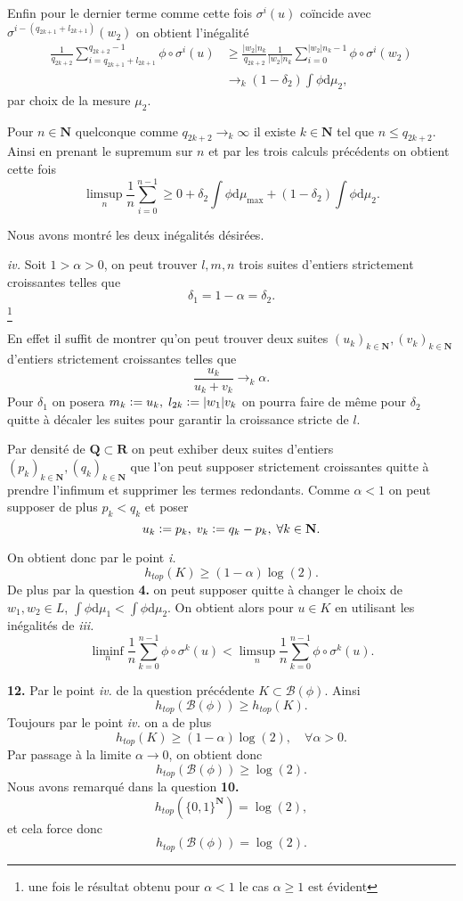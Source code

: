 \documentclass[12pt]{article}
\newcommand{\defeq}{\vcentcolon=}
\newcommand{\R}{\mathbf{R}}
\newcommand{\N}{\mathbf{N}}
\newcommand{\Q}{\mathbf{Q}}
\newcommand{\de}{\mathrm{d}}
\begin{document}
Enfin pour le dernier terme comme cette fois $\sigma^{i}(u)$ coïncide avec $\sigma^{i-(q_{2k+1}+l_{2k+1})}(w_{2})$ on obtient l'inégalité
\begin{align*}
        \frac{1}{q_{2k+2}}\sum_{i=q_{2k+1}+l_{2k+1}}^{q_{2k+2}-1} \phi\circ\sigma^{i}(u) &\ge \frac{|w_{2}|n_{k}}{q_{2k+2}}\frac{1}{|w_{2}|n_{k}}\sum_{i=0}^{|w_{2}|n_{k}-1} \phi\circ\sigma^{i}(w_{2}) \\
                                                                                     &\to_{k}(1-\delta_{2})\int\phi\de\mu_{2}
,\end{align*} par choix de la mesure $\mu_{2}$.

Pour $n \in \N$ quelconque comme $q_{2k+2}\to_{k}\infty$ il existe $k \in \N$ tel que $n \le q_{2k+2}$. Ainsi en prenant le supremum sur $n$ et par les trois calculs précédents on obtient cette fois  \[
        \limsup_{n}\frac{1}{n}\sum_{i=0}^{n-1} \ge 0 + \delta_{2}\int\phi\de\mu_{\max} + (1-\delta_{2})\int\phi\de\mu_{2}
.\]

Nous avons montré les deux inégalités désirées.
\medskip

\textit{iv.} Soit $1 > \alpha > 0$, on peut trouver $l, m, n$ trois suites d'entiers strictement croissantes telles que  \[
\delta_{1} = 1 - \alpha = \delta_{2}
.\]\footnote{une fois le résultat obtenu pour $\alpha < 1$ le cas $\alpha \ge 1$ est évident}

En effet il suffit de montrer qu'on peut trouver deux suites $(u_{k})_{k\in\N}, (v_{k})_{k\in\N}$ d'entiers strictement croissantes telles que \[
        \frac{u_{k}}{u_{k}+v_{k}} \to_{k} \alpha
.\] Pour $\delta_{1}$ on posera $m_{k} \defeq u_{k}, \; l_{2k} \defeq |w_{1}|v_{k}$ on pourra faire de même pour $\delta_{2}$ quitte à décaler les suites pour garantir la croissance stricte de $l$. 

Par densité de $\Q \subset \R$ on peut exhiber deux suites d'entiers $(p_{k})_{k\in\N}, (q_{k})_{k\in\N}$ que l'on peut supposer strictement croissantes quitte à prendre l'infimum et supprimer les termes redondants. Comme $\alpha < 1$ on peut supposer de plus $p_{k} < q_{k}$ et poser  \[
u_{k} \defeq p_{k}, \; v_{k} \defeq q_{k} - p_{k}, \; \forall k \in \N
.\] 

On obtient donc par le point \textit{i.} \[
h_{top}(K) \ge (1-\alpha)\log(2)
.\] De plus par la question \textbf{4.} on peut supposer quitte à changer le choix de $w_{1}, w_{2} \in L$, $\int\phi\de\mu_{1} < \int\phi\de\mu_{2}$. On obtient alors pour $u \in K$ en utilisant les inégalités de \textit{iii.}
\[
        \liminf_{n}\frac{1}{n}\sum_{k=0}^{n-1} \phi\circ\sigma^{k}(u) < \limsup_{n}\frac{1}{n}\sum_{k=0}^{n-1} \phi\circ\sigma^{k}(u)
.\] 

\medskip

\textbf{12.} Par le point \textit{iv.} de la question précédente $K \subset \mathcal{B}(\phi)$. Ainsi \[
        h_{top}(\mathcal{B}(\phi)) \ge h_{top}(K)
.\] Toujours par le point \textit{iv.} on a de plus  \[
h_{top}(K) \ge (1-\alpha)\log(2), \quad \forall \alpha > 0
.\]
Par passage à la limite $\alpha \to 0$, on obtient donc \[
        h_{top}(\mathcal{B}(\phi)) \ge \log(2)
.\] 
Nous avons remarqué dans la question \textbf{10.} \[
        h_{top}(\{0,1\}^{\N}) = \log(2)
,\] et cela force donc \[
h_{top}(\mathcal{B}(\phi)) = \log(2)
.\]  
\end{document}

